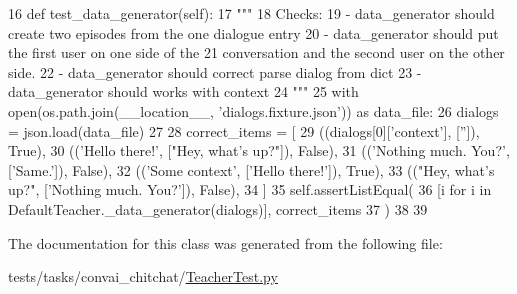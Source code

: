 \begin{DoxyCode}
16     \textcolor{keyword}{def }test\_data\_generator(self):
17         \textcolor{stringliteral}{"""}
18 \textcolor{stringliteral}{        Checks:}
19 \textcolor{stringliteral}{        - data\_generator should create two episodes from the one dialogue entry}
20 \textcolor{stringliteral}{        - data\_generator should put the first user on one side of the}
21 \textcolor{stringliteral}{          conversation and the second user on the other side.}
22 \textcolor{stringliteral}{        - data\_generator should correct parse dialog from dict}
23 \textcolor{stringliteral}{        - data\_generator should works with context}
24 \textcolor{stringliteral}{        """}
25         with open(os.path.join(\_\_location\_\_, \textcolor{stringliteral}{'dialogs.fixture.json'})) \textcolor{keyword}{as} data\_file:
26             dialogs = json.load(data\_file)
27 
28         correct\_items = [
29             ((dialogs[0][\textcolor{stringliteral}{'context'}], [\textcolor{stringliteral}{''}]), \textcolor{keyword}{True}),
30             ((\textcolor{stringliteral}{'Hello there!'}, [\textcolor{stringliteral}{"Hey, what's up?"}]), \textcolor{keyword}{False}),
31             ((\textcolor{stringliteral}{'Nothing much. You?'}, [\textcolor{stringliteral}{'Same.'}]), \textcolor{keyword}{False}),
32             ((\textcolor{stringliteral}{'Some context'}, [\textcolor{stringliteral}{'Hello there!'}]), \textcolor{keyword}{True}),
33             ((\textcolor{stringliteral}{"Hey, what's up?"}, [\textcolor{stringliteral}{'Nothing much. You?'}]), \textcolor{keyword}{False}),
34         ]
35         self.assertListEqual(
36             [i \textcolor{keywordflow}{for} i \textcolor{keywordflow}{in} DefaultTeacher.\_data\_generator(dialogs)], correct\_items
37         )
38 
39 
\end{DoxyCode}


The documentation for this class was generated from the following file\+:\begin{DoxyCompactItemize}
\item 
tests/tasks/convai\+\_\+chitchat/\hyperlink{TeacherTest_8py}{Teacher\+Test.\+py}\end{DoxyCompactItemize}
